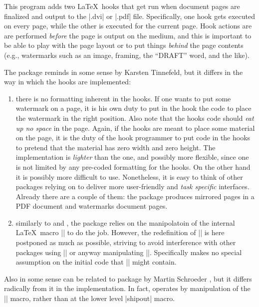 
 This program adds two \LaTeX\ hooks that get run when document
 pages are finalized and output to the |.dvi| or |.pdf|
 file. Specifically, one hook gets executed on every page, while the
 other is executed for the current page. Hook actions are are performed
 \emph{before} the page is output on the medium, and this is
 important to be able to play with the page layout or to put things
 \emph{behind} the page contents (e.g., watermarks such as an image,
 framing, the ``DRAFT'' word, and the like).
 
 The package reminds in some sense  by Karsten
 Tinnefeld, but it differs in the way in which the hooks are
 implemented:
 


 \begin{enumerate}
 \item there is no formatting inherent in the hooks. If one wants to
   put some watermark on a page, it is his own duty to put in the
   hook the code to place the watermark in the right position. Also
   note that the hooks code should \emph{eat up no space} in the
   page.  Again, if the hooks are meant to place some material on the
   page, it is the duty of the hook programmer to put code in the
   hooks to pretend that the material has zero width and zero height.
   The implementation is \emph{lighter} than the  one,
   and possibly more flexible, since one is not limited by any
   pre-coded formatting for the hooks. On the other hand it is
   possibly more difficult to use. Nonetheless, it is easy to think
   of other packages relying on  to deliver more
   user-friendly and \emph{task specific} interfaces. Already there
   are a couple of them: the package  produces
   mirrored pages in a PDF document and 
   watermarks document pages.
 \item similarly to  and , the
   package relies on the manipolatoin of the internal \LaTeX\ macro
   |\@begindvi| to do the job. However, the redefinition of
   |\@begindvi| is here postponed as much as possible, striving to
   avoid interference with other packages using |\AtBeginDvi| or
   anyway manipulating |\@begindvi|. Specifically 
   makes no special assumption on the initial code that |\@begindvi|
   might contain.
 \end{enumerate}



Also in some sense  can be related to package
  by Martin Schroeder \cite{everyshi}, but it differs radically from
 it in the implementation. In fact, operates by
 manipulation of the |\@begindvi| macro, rather than at the
 lower level |shipout| macro.


